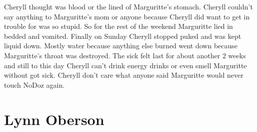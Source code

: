 \documentclass[12pt]{book}
\begin{document}
Cheryll thought was blood or the lined of Marguritte's stomach. Cheryll couldn't say anything to Marguritte's mom or anyone because Cheryll did want to get in trouble for was so stupid. So for the rest of the weekend Marguritte lied in bedded and vomited. Finally on Sunday Cheryll stopped puked and was kept liquid down. Mostly water because anything else burned went down because Marguritte's throat was destroyed. The sick felt last for about another 2 weeks and still to this day Cheryll can't drink energy drinks or even smell Marguritte without got sick. Cheryll don't care what anyone said Marguritte would never touch NoDoz again.



\chapter{Lynn Oberson}
\end{document}
